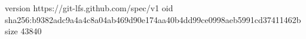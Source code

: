 version https://git-lfs.github.com/spec/v1
oid sha256:b9382adc9a4a4c8a04ab469d90e174aa40b4dd99ce0998aeb5991cd37411462b
size 43840
